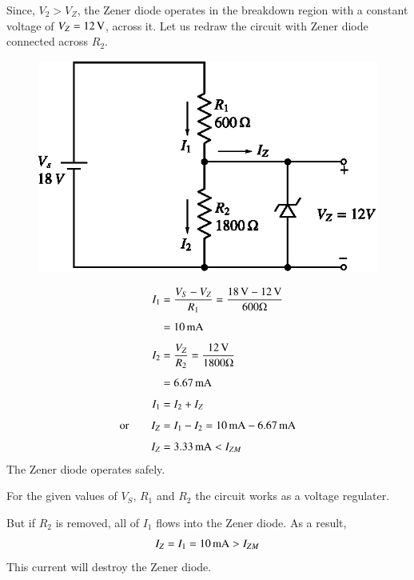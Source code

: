 \begin{solution}
Since, $V_{2}>V_{Z}$, the Zener diode operates in the breakdown region with a constant voltage of $V_{Z}=12\text{\,V}$, across it. Let us redraw the circuit with Zener diode connected across $R_{2}$.
\begin{figure}[H]
\centering
\includegraphics{chap2/sol2.29b.eps}
\end{figure}
\begin{align*}
I_{1} &= \dfrac{V_{S}-V_{Z}}{R_{1}}=\dfrac{18\text{\,V}-12\text{\,V}}{600\Omega}\\[4pt]
&= 10\text{\,mA}\\[4pt]
I_{2} &= \dfrac{V_{Z}}{R_{2}}=\dfrac{12\text{\,V}}{1800\Omega}\\[4pt]
&= 6.67\text{\,mA}\\[4pt]
I_{1} &= I_{2}+I_{Z}\\[4pt]
\text{or}\qquad I_{Z} &= I_{1}-I_{2}=10\text{\,mA}-6.67\text{\,mA}\\[4pt]
I_{Z} &= 3.33\text{\,mA}<I_{ZM}
\end{align*}
The Zener diode operates safely.

For the given values of $V_{S}$, $R_{1}$ and $R_{2}$ the circuit works as a voltage regulater.

But if $R_{2}$ is removed, all of $I_{1}$ flows into the Zener diode. As a result,
$$
I_{Z}=I_{1}=10\text{\,mA}>I_{ZM}
$$
This current will destroy the Zener diode.
\end{solution}

